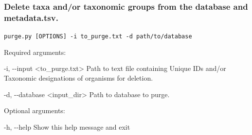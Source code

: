 \documentclass{article}
\def\code#1{\texttt{#1}}
\begin{document}
        \vspace{0.5cm}
        
        \subsubsection{Delete taxa and/or taxonomic groups from the database and metadata.tsv.}
        \begin{description}
        
            \vspace{0.2cm}
            \item \code{purge.py [OPTIONS] -i to\_purge.txt -d path/to/database}
            \vspace{0.2cm}
            
            \begin{description}
                \item Required arguments:
                \begin{description}
                    \item -i, -\/-input <to\_purge.txt>  Path to text file containing Unique IDs and/or Taxonomic designations of organisms for deletion.
                     \item -d, -\/-database <input\_dir> Path to database to purge.
                \end{description}
            \end{description}
            \vspace{0.2cm}
            \begin{description}
                \item Optional arguments:
                \begin{description}
                    \item -h, -\/-help \hspace{0.2cm} Show this help message and exit
                \end{description}
            \end{description}
        \end{description}
                        
        \vspace{0.5cm}
        
\end{document}

